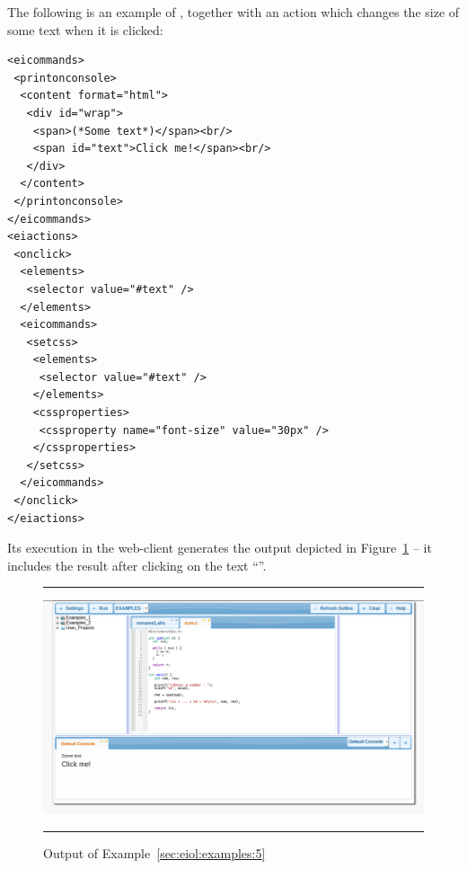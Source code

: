 \begin{example}
\label{sec:eiol:examples:5}
%
The following is an example of ,
together with an action  which
changes the size of some text when it is clicked:

\medskip
\begin{lstlisting}
<eicommands>
 <printonconsole>
  <content format="html">
   <div id="wrap">
    <span>(*Some text*)</span><br/>
    <span id="text">Click me!</span><br/>
   </div> 
  </content>
 </printonconsole>
</eicommands>
<eiactions>
 <onclick>
  <elements>
   <selector value="#text" />
  </elements>
  <eicommands>
   <setcss>
    <elements>
     <selector value="#text" />
    </elements>
    <cssproperties>
     <cssproperty name="font-size" value="30px" />
    </cssproperties>
   </setcss>
  </eicommands>
 </onclick>
</eiactions>
\end{lstlisting}

\medskip
\noindent
Its execution in the web-client generates the output depicted in
Figure~\ref{fig:examples:5} -- it includes the result after clicking
on the text ``''.

\begin{figure}[h]
\hrule\smallskip
\begin{center}
\includegraphics[width=1\textwidth]{fig/example5.png}
\end{center}
\caption{Output of Example~\ref{sec:eiol:examples:5}}
\label{fig:examples:5}
\hrule
\end{figure}
\end{example}

